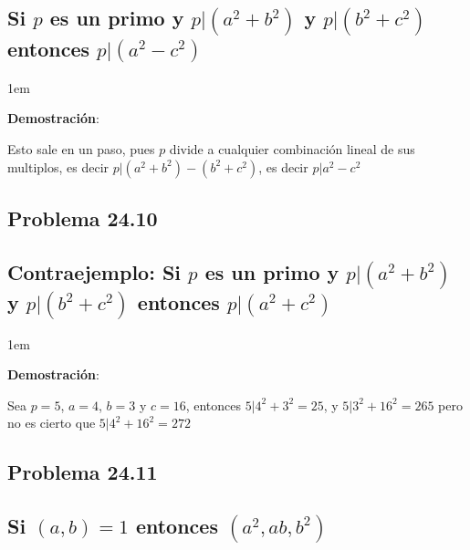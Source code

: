 \documentclass[12pt, fleqn]{article}                             %
\newenvironment{SmallIndentation}[1][0.75em]                    %
    {\begin{adjustwidth}{#1}{}\begin{footnotesize}}                 %
    {\end{footnotesize}\end{adjustwidth}}                           %
\begin{document}
    \subsection*{Si $p$ es un primo y $p|(a^2+b^2)$
        y $p|(b^2+c^2)$ entonces $p|(a^2-c^2)$}

    \begin{SmallIndentation}[1em]
        \textbf{Demostración}:
        
        Esto sale en un paso, pues $p$ divide a cualquier combinación lineal
        de sus multiplos, es decir $p|(a^2+b^2)-(b^2+c^2)$, es decir
        $p|a^2-c^2$

    \end{SmallIndentation}


    \clearpage
    \subsection{Problema 24.10}
    \subsection*{Contraejemplo: Si $p$ es un primo y $p|(a^2+b^2)$
        y $p|(b^2+c^2)$ entonces $p|(a^2+c^2)$}

    \begin{SmallIndentation}[1em]
        \textbf{Demostración}:
        
        Sea $p=5$, $a=4$, $b=3$ y $c=16$, entonces $5|4^2+3^2=25$, y
        $5|3^2 + 16^2 =265$ pero no es cierto que $5|4^2+16^2=272$

    \end{SmallIndentation}


    \subsection{Problema 24.11}
    \subsection*{Si $(a,b)=1$ entonces $(a^2, ab, b^2)$}
\end{document}
